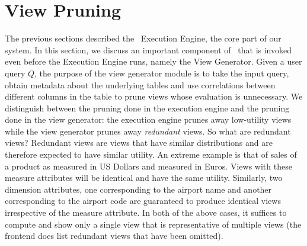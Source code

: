 
\section{View Pruning}
\label{sec:pruning}

The previous sections described the \VizRecDB\ Execution Engine, the core part
of our system.
In this section, we discuss an important component of \VizRecDB\ that is invoked
even before the Execution Engine runs, namely the View Generator.
Given a user query $Q$, the purpose of the view generator module is to take the
input query, obtain metadata about the underlying tables and use correlations
between different columns in the table to prune views whose evaluation is
unnecessary. 
We distinguish between the pruning done in the execution engine and the pruning
done in the view generator: the execution engine prunes away low-utility views
while the view generator prunes away {\it redundant} views.
So what are redundant views? Redundant views are views that have similar
distributions and are therefore expected to have similar utility.
An extreme example is that of sales of a product as measured in US
Dollars and measured in Euros. Views with these measure attributes will be
identical and have the same utility.
Similarly, two dimension attributes, one corresponding to the airport name
and another corresponding to the airport code are guaranteed to produce identical
views irrespective of the measure attribute.
In both of the above cases, it suffices to compute and show only a single view
that is representative of multiple views (the frontend does list redundant
views that have been omitted).

